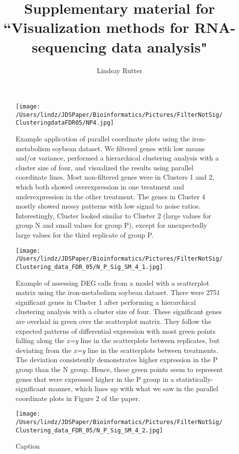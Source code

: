 \documentclass{article}
\begin{document}
\title{Supplementary material for ``Visualization methods for RNA-sequencing data analysis"}
\author{Lindsay Rutter}

\maketitle

\begin{figure}[!p]
\centerline{\texttt{[image: /Users/lindz/JDSPaper/Bioinformatics/Pictures/FilterNotSig/ClusteringdataFDR05/NP4.jpg]}}
\caption{Example application of parallel coordinate plots using the iron-metabolism soybean dataset. We filtered genes with low means and/or variance, performed a hierarchical clustering analysis with a cluster size of four, and visualized the results using parallel coordinate lines. Most non-filtered genes were in Clusters 1 and 2, which both showed overexpression in one treatment and underexpression in the other treatment. The genes in Cluster 4 mostly showed messy patterns with low signal to noise ratios. Interestingly, Cluster looked similar to Cluster 2 (large values for group N and small values for group P), except for unexpectedly large values for the third replicate of group P.
\label{suppNonSigCluster}}
\end{figure}

\begin{figure}[!p]
\centerline{\texttt{[image: /Users/lindz/JDSPaper/Bioinformatics/Pictures/FilterNotSig/Clustering\_data\_FDR\_05/N\_P\_Sig\_SM\_4\_1.jpg]}}
\caption{Example of assessing DEG calls from a model with a scatterplot matrix using the iron-metabolism soybean dataset. There were 2751 significant genes in Cluster 1 after performing a hierarchical clustering analysis with a cluster size of four. These significant genes are overlaid in green over the scatterplot matrix. They follow the expected patterns of differential expression with most green points falling along the \textit{x=y} line in the scatterplots between replicates, but deviating from the \textit{x=y} line in the scatterplots between treatments. The deviation consistently demonstrates higher expression in the P group than the N group. Hence, these green points seem to represent genes that were expressed higher in the P group in a statistically-significant manner, which lines up with what we saw in the parallel coordinate plots in Figure 2 of the paper.
\label{suppSMCluster1}}
\end{figure}

\begin{figure}[!p]
\centerline{\texttt{[image: /Users/lindz/JDSPaper/Bioinformatics/Pictures/FilterNotSig/Clustering\_data\_FDR\_05/N\_P\_Sig\_SM\_4\_2.jpg]}}
\caption{Caption
\label{suppSMCluster2}}
\end{figure}
  
\end{document}
